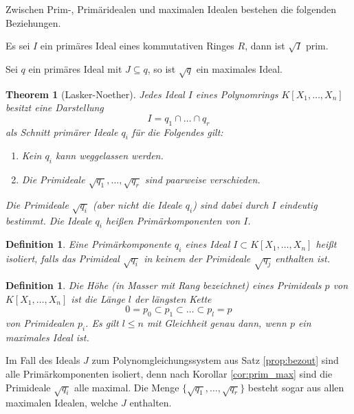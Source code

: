 \documentclass[11pt]{beamer}
\theoremstyle{custom}
\newtheorem{thm}{Theorem}[section]
\theoremstyle{custom}
\newtheorem{dfn}[theorem]{Definition}
\begin{document}
	\begin{frame}
		\pause
		Zwischen Prim-, Primäridealen und maximalen Idealen bestehen die folgenden Beziehungen.
		\begin{lemma}\label{cor:prim_max}
			\pause
			Es sei $I$ ein primäres Ideal eines kommutativen Ringes $R$, dann ist $\sqrt{I}$ prim.
		\end{lemma}
		\begin{lemma}
			\pause
			Sei $q$ ein primäres Ideal mit $J \subseteq q$, so ist $\sqrt{q}$ ein maximales Ideal.
		\end{lemma}
	\end{frame}
	\begin{frame}
		\begin{thm}[Lasker-Noether]
			\pause
			Jedes Ideal $I$ eines Polynomrings $K[X_1,\ldots,X_n]$ besitzt eine Darstellung
			\[I = q_1 \cap \ldots \cap q_r\]
			als Schnitt primärer Ideale $q_i$ für die Folgendes gilt:
			\begin{enumerate}
				\item Kein $q_i$ kann weggelassen werden.
				\item Die Primideale $\sqrt{q_1}, \ldots, \sqrt{q_r}$ sind paarweise verschieden.
			\end{enumerate}
			Die Primideale $\sqrt{q_i}$ (aber nicht die Ideale $q_i$) sind dabei durch $I$ eindeutig bestimmt. Die Ideale $q_i$ heißen Primärkomponenten von $I$.
		\end{thm}
	\end{frame}
	\begin{frame}
		\begin{dfn}
			\pause
			Eine Primärkomponente $q_i$ eines Ideal $I \subset K[X_1,\ldots,X_n]$ heißt isoliert, falls das Primideal $\sqrt{q_i}$ in keinem der Primideale $\sqrt{q_j}$ enthalten ist.
		\end{dfn}
		\begin{dfn}
			\pause
			Die Höhe (in Masser \cite{masser1983fields} mit Rang bezeichnet) eines Primideals $p$ von $K[X_1,\ldots,X_n]$ ist die Länge $l$ der längsten Kette \[0=p_0 \subset p_1 \subset \ldots \subset p_l = p\] von Primidealen $p_i$. Es gilt $l \leq n$ mit Gleichheit genau dann, wenn $p$ ein maximales Ideal ist.
		\end{dfn}
	\end{frame}
	\begin{frame}
		\begin{lemma}\label{cor:gls_prim_max}
			\pause
			Im Fall des Ideals $J$ zum Polynomgleichungssystem aus Satz \ref{prop:bezout} sind alle
			Primärkomponenten isoliert, denn nach Korollar \ref{cor:prim_max} sind  die Primideale $\sqrt{q_i}$ alle maximal. Die Menge $\{\sqrt{q_1},\ldots,\sqrt{q_r}\}$ besteht sogar aus allen maximalen Idealen, welche $J$ enthalten.
		\end{lemma}
	\end{frame}
\end{document}
